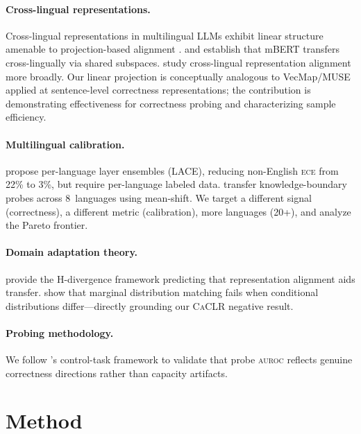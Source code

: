 \documentclass[11pt,a4paper]{article}
\newcommand{\aur}{\textsc{auroc}}
\newcommand{\ece}{\textsc{ece}}
\newcommand{\caclr}{\textsc{CaCLR}}
\begin{document}
\paragraph{Cross-lingual representations.}
Cross-lingual representations in multilingual LLMs exhibit linear structure amenable to projection-based alignment \cite{conneau2018word,artetxe2018robust}. \citet{pires2019multilingual} and \citet{wu2019beto} establish that mBERT transfers cross-lingually via shared subspaces. \citet{ravisankar2026dali} study cross-lingual representation alignment more broadly. Our linear projection is conceptually analogous to VecMap/MUSE applied at sentence-level correctness representations; the contribution is demonstrating effectiveness for correctness probing and characterizing sample efficiency.

\paragraph{Multilingual calibration.}
\citet{zhou2025lace} propose per-language layer ensembles (LACE), reducing non-English \ece{} from 22\% to 3\%, but require per-language labeled data. \citet{xiao2025knowledge} transfer knowledge-boundary probes across 8~languages using mean-shift. We target a different signal (correctness), a different metric (calibration), more languages (20+), and analyze the Pareto frontier.

\paragraph{Domain adaptation theory.}
\citet{bendavid2010theory} provide the H-divergence framework predicting that representation alignment aids transfer. \citet{zhao2019learning} show that marginal distribution matching fails when conditional distributions differ---directly grounding our \caclr{} negative result.

\paragraph{Probing methodology.}
We follow \citet{hewitt2019designing}'s control-task framework to validate that probe \aur{} reflects genuine correctness directions rather than capacity artifacts.

\section{Method}
\end{document}
